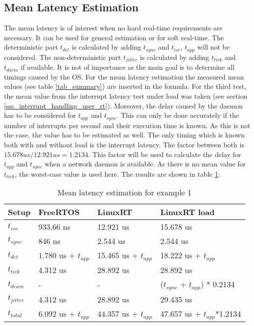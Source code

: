 \subsection{Mean Latency Estimation}\label{sss_mean_latency_estimation}
The mean latency is of interest when no hard real-time requirements are necessary. 
It can be used for general estimation or for soft real-time.
The deterministic part $t_{det}$ is calculated by adding $t_{sync}$ and $t_{isr}$, $t_{app}$ will not be considered. 
The non-deterministic part $t_{jitter}$ is calculated by adding $t_{tick}$ and $t_{daem}$ if available.
It is not of importance as the main goal is to determine all timings caused by the \ac{OS}.
For the mean latency estimation the measured mean values (see table \ref{tab_summary}) are inserted in the formula.
For the third test, the mean value from the interrupt latency test under load was taken (see section \ref{sss_interrupt_handling_user_rt}).
Moreover, the delay caused by the daemon has to be considered for $t_{app}$ and $t_{sync}$.
This can only be done accurately if the number of interrupts per second and their execution time is known.
As this is not the case, the value has to be estimated as well.
The only timing which is known both with and without load is the interrupt latency.
The factor between both is $15.678 us / 12.921 us = 1.2134 $.   
This factor will be used to calculate the delay for $t_{app}$ and $t_{sync}$ when a network daemon is available.
As there is no mean value for $t_{tick}$, the worst-case value is used here. 
The results are shown in table \ref{tab_example1_mean}:
\begin{table}[htbp]
	\centering
		\begin{tabular}{|l|l|l|l|}
			\hline
				Setup					& FreeRTOS 								& LinuxRT 							& LinuxRT load  \\
				\hline 
				$t_{isr}$ 		& 933.66 ns 							& 12.921 us 						& 15.678 us			\\
			  $t_{sync}$		& 846 ns	  							& 2.544 us 				 			& 2.544 us			\\
			  \hline 
			  $t_{det}$			& 1.780 us + $t_{app}$		& 15.465 us + $t_{app}$	& 18.222 us	+ $t_{app}$		\\ 
			  \hline
			  \hline
			  $t_{tick}$		& 4.312 us								& 28.892 us 					  & 28.892 us											\\
			  $t_{deam}$		& -				  							& - 				 						& ($t_{sync}$ + $t_{app}$) * 0.2134 \\ 
				\hline 
			  $t_{jitter}$	& 4.312 us  							& 28.892 us						  & 29.435 us											\\ 
			  \hline
			  \hline 
			  $t_{total}$		& 6.092 us + $t_{app}$	 & 44.357 us + $t_{app}$  &	47.657 us + $t_{app}$*1.2134 	\\ 
			\hline
		\end{tabular}
	\caption{Mean latency estimation for example 1}
	\label{tab_example1_mean}
\end{table}

